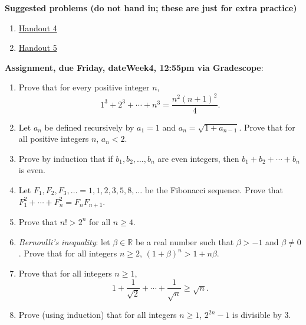 \documentclass[12pt]{article}
\newcommand{\HWdueTime}{12:55pm }
\begin{document}
\noindent \textbf{Suggested problems (do not hand in; these are just for extra practice)}

\begin{enumerate}
\item \href{https://www.math.emory.edu/~dzb/teaching/250Fall2021/handouts/250-H04-induction-warmup.pdf}{Handout 4}
\item \href{https://www.math.emory.edu/~dzb/teaching/250Fall2021/handouts/250-H05-induction-problems.pdf}{Handout 5}
\end{enumerate}

\noindent \textbf{Assignment, due Friday, \csname dateWeek4\endcsname, \HWdueTime via Gradescope}:
\begin{enumerate}
\item Prove that for every positive integer $n$,
 $$1^3 + 2^3 + \cdots +n^3 = \frac{n^2(n+1)^2}{4}.$$ 
\item Let $a_n$ be defined recursively by $a_1 = 1$ and $a_n = \sqrt{1 + a_{n-1}}$. Prove that for all positive integers $n$, $a_n < 2$.
\item Prove by induction that if $b_1, b_2, \ldots , b_n$ are even integers, then $b_1 + b_2 + \cdots + b_n$ is even.
 \item Let $F_1, F_2, F_3, \ldots = 1,1,2,3,5,8,\ldots$ be the Fibonacci sequence. Prove that $F_1^2 + \cdots + F_n^2 = F_nF_{n+1}$.
 \item Prove that $n! > 2^n$ for all $n \geq 4$.
 \item \emph{Bernoulli's inequality}: let $\beta \in \mathbb{R}$ be a real number such that $\beta > -1$ and $\beta \neq 0$. Prove that for all integers $n \geq 2$, $(1 + \beta)^n > 1 + n\beta$.
 \item Prove that for all integers $n \geq 1$,
   \[
1 + \frac{1}{\sqrt{2}} + \cdots + \frac{1}{\sqrt{n}} \geq \sqrt{n}.
     \]
   \item Prove (using induction) that for all integers $n \geq 1$, $2^{2n}-1$ is divisible by 3.
 \end{enumerate}


 
\newpage
\end{document}
